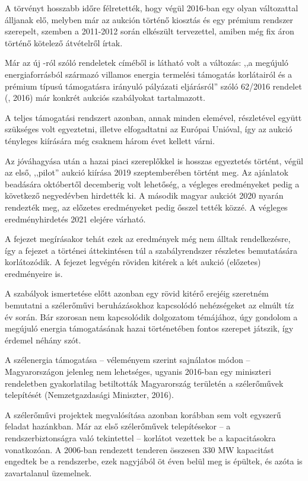 \documentclass[twoside, magyar, showtrims]{corvinusphd}
\theoremstyle{plain}
\theoremstyle{remark}
\theoremstyle{definition}
\begin{document}
A törvényt hosszabb időre félretették,
hogy végül 2016-ban egy olyan változattal álljanak elő,
melyben már az aukción történő kiosztás
és egy prémium rendszer szerepelt, szemben a 2011-2012
során elkészült tervezettel, amiben még fix áron történő
kötelező átvételről írtak.

Már az új -ról szóló rendeletek
címéből is látható volt a változás:
,,a megújuló energiaforrásból származó
villamos energia termelési támogatás
korlátairól és a prémium típusú támogatásra
irányuló pályázati eljárásról'' szóló 
62/2016  rendelet (, 2016)
már konkrét aukciós szabályokat tartalmazott.

A teljes támogatási rendszert azonban,
annak minden elemével, részletével együtt
szükséges volt egyeztetni, illetve elfogadtatni
az Európai Unióval, így az aukció tényleges
kiírására még csaknem három évet kellett várni.

Az  jóváhagyása után a hazai
piaci szereplőkkel is hosszas egyeztetés
történt, végül az első, ,,pilot'' aukció kiírása
2019 szeptemberében történt meg.
Az ajánlatok beadására októbertől
decemberig volt lehetőség, a
végleges eredményeket pedig a következő negyedévben
hirdették ki. A második magyar aukciót
2020 nyarán rendezték meg, 
az előzetes eredményeket pedig
ősszel tették közzé. A végleges
eredményhirdetés 2021 elejére várható.

A fejezet megírásakor tehát ezek az
eredmények még nem álltak rendelkezésre,
így a fejezet a történei áttekintésen túl a
szabályrendszer részletes bemutatására korlátozódik.
A fejezet legvégén röviden kitérek a két aukció 
(előzetes) eredményeire is.

A szabályok ismertetése előtt azonban
egy rövid kitérő erejéig szeretném bemutatni
a szélerőművi beruházásokhoz kapcsolódó
nehézségeket az elmúlt tíz év során. Bár szorosan
nem kapcsolódik dolgozatom témájához,
úgy gondolom a megújuló energia támogatásának
hazai történetében fontos szerepet
játszik, így érdemel néhány szót.

A szélenergia támogatása -- véleményem szerint
sajnálatos módon -- Magyarországon jelenleg
nem lehetséges, ugyanis 2016-ban egy
miniszteri rendeletben gyakorlatilag
betiltották Magyarország területén a szélerőművek
telepítését (Nemzetgazdasági Miniszter, 2016).

A szélerőművi projektek megvalósítása
azonban korábban sem volt egyszerű
feladat hazánkban. Már az első szélerőművek telepítésekor
-- a rendszerbiztonságra való tekintettel -- 
korlátot vezettek be a kapacitásokra vonatkozóan.
A 2006-ban rendezett tenderen összesen 330 MW
kapacitást engedtek be a rendszerbe, ezek nagyjából öt éven 
belül meg is épültek, és azóta is zavartalanul üzemelnek. 
\end{document}
